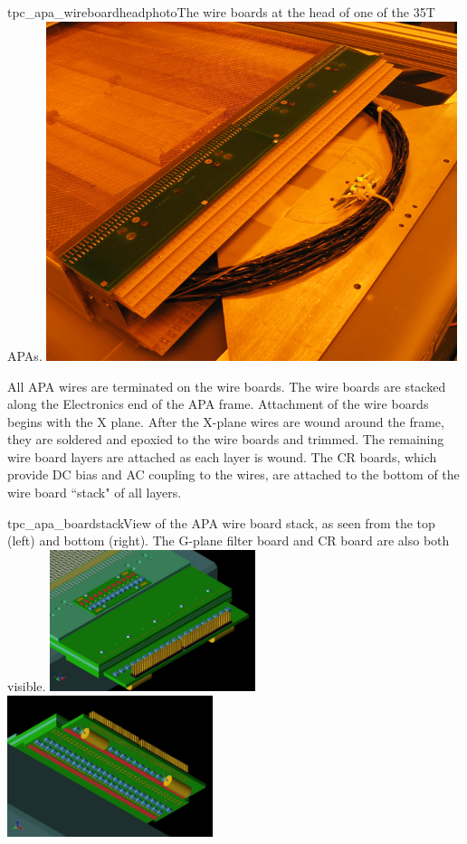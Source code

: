 \begin{cdrfigure}{tpc_apa_wireboardheadphoto}{The wire boards at the head of one of the 35T APAs.}
\includegraphics[width=0.9\textwidth]{figures/tpc_apa_wireboardheadphoto.png} 
\end{cdrfigure}

All APA wires are terminated on the wire boards. The wire boards are stacked along the Electronics end of the APA frame. Attachment of the wire boards begins with the X plane. After the X-plane wires are wound around the frame, they are soldered and epoxied to the wire boards and trimmed. The remaining wire board layers are attached as each layer is wound.  The CR boards, which provide DC bias and AC coupling to the wires, are attached to the bottom of the wire board ``stack" of all layers.

\begin{cdrfigure}{tpc_apa_boardstack}{View of the APA wire board stack, as seen from the top (left) and bottom (right).  The G-plane filter board and CR board are also both visible.}
\includegraphics[width=0.45\textwidth]{figures/tpc_apa_boardstack_top.png}
\includegraphics[width=0.45\textwidth]{figures/tpc_apa_boardstack_bottom.png}
\end{cdrfigure}

